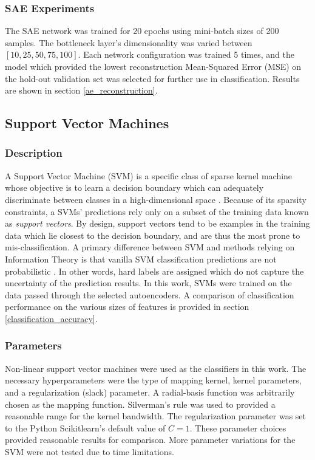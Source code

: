 \documentclass[conference]{IEEEtran}
\begin{document}
  	\subsubsection*{SAE Experiments}
  	The SAE network was trained for 20 epochs using mini-batch sizes of 200 samples.  The bottleneck layer's dimensionality was varied between $[10,25,50,75,100]$.  Each network configuration was trained 5 times, and the model which provided the lowest reconstruction  Mean-Squared Error (MSE) on the hold-out validation set was selected for further use in classification.  Results are shown in section \ref{ae_reconstruction}.
  	
	 \subsection{Support Vector Machines}
	 \subsubsection*{Description}
	 A Support Vector Machine (SVM) is a specific class of sparse kernel machine whose objective  is to learn a decision boundary which can adequately discriminate between classes in a high-dimensional space \cite{Lin2011svm,Sanchez2011svm}.  Because of its sparsity constraints, a SVMs' predictions rely only on a subset of the training data known as \textit{support vectors}. By design, support vectors tend to be examples in the training data which lie closest to the decision boundary, and are thus the most prone to mis-classification. A primary difference between SVM and methods relying on Information Theory is that vanilla SVM classification predictions are not probabilistic \cite{Murphy2012Textbook}.  In other words, hard labels are assigned which do not capture the uncertainty of the prediction results.  In this work, SVMs were trained on the data passed through the selected autoencoders.  A comparison of classification performance on the various sizes of features is provided in section \ref{classification_accuracy}.
	 
	 \subsubsection*{Parameters}
	 Non-linear support vector machines were used as the classifiers in this work. The necessary hyperparameters were the type of mapping kernel,  kernel parameters, and a regularization (slack) parameter.  A radial-basis function was arbitrarily chosen as the mapping function.  Silverman's rule was used to provided a reasonable range for the kernel bandwidth. The regularization parameter was set to the Python Scikitlearn's default value of $C=1$.  These parameter choices provided reasonable results for comparison.  More parameter variations for the SVM were not tested due to time limitations.
	 
\end{document}
